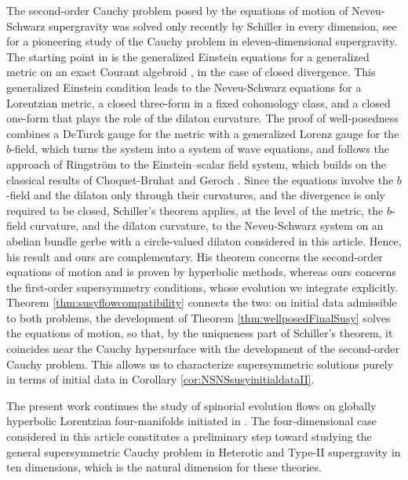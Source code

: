 \documentclass[10pt,reqno,a4paper]{amsart}
\theoremstyle{plain}
\theoremstyle{definition}
\theoremstyle{remark}
\theoremstyle{remark}
\renewcommand{\(}{ (}
\renewcommand{\)}{ )}
\begin{document}
The second-order Cauchy problem posed by the equations of motion of Neveu-Schwarz supergravity was solved only recently by Schiller \cite{Schiller:2026vls} in every dimension, see \cite{CB85} for a pioneering study of the Cauchy problem in eleven-dimensional supergravity. The starting point in \cite{Schiller:2026vls} is the generalized Einstein equations for a generalized metric on an exact Courant algebroid \cite{GarciaFernandezStreets}, in the case of closed divergence. This generalized Einstein condition leads to the Neveu-Schwarz equations for a Lorentzian metric, a closed three-form in a fixed cohomology class, and a closed one-form that plays the role of the dilaton curvature. The proof of well-posedness combines a DeTurck gauge for the metric with a generalized Lorenz gauge for the $b$-field, which turns the system into a system of wave equations, and follows the approach of Ringstr\"om \cite{Ringstrom} to the Einstein--scalar field system, which builds on the classical results of Choquet-Bruhat and Geroch \cite{ChoquetBruhatGeroch}. Since the equations involve the $b$-field and the dilaton only through their curvatures, and the divergence is only required to be closed, Schiller's theorem applies, at the level of the metric, the $b$-field curvature, and the dilaton curvature, to the Neveu-Schwarz system on an abelian bundle gerbe with a circle-valued dilaton considered in this article. Hence, his result and ours are complementary. His theorem concerns the second-order equations of motion and is proven by hyperbolic methods, whereas ours concerns the first-order supersymmetry conditions, whose evolution we integrate explicitly. Theorem \ref{thm:susyflowcompatibility} connects the two: on initial data admissible to both problems, the development of Theorem \ref{thm:wellposedFinalSusy} solves the equations of motion, so that, by the uniqueness part of Schiller's theorem, it coincides near the Cauchy hypersurface with the development of the second-order Cauchy problem. This allows us to characterize supersymmetric solutions purely in terms of initial data in Corollary \ref{cor:NSNSsusyinitialdataII}.\medskip

The present work continues the study of spinorial evolution flows on globally hyperbolic Lorentzian four-manifolds initiated in \cite{Murcia:2020zig,Murcia:2021dur,MurciaKundt}. The four-dimensional case considered in this article constitutes a preliminary step toward studying the general supersymmetric Cauchy problem in Heterotic and Type-II supergravity in ten dimensions, which is the natural dimension for these theories.\medskip
\end{document}
